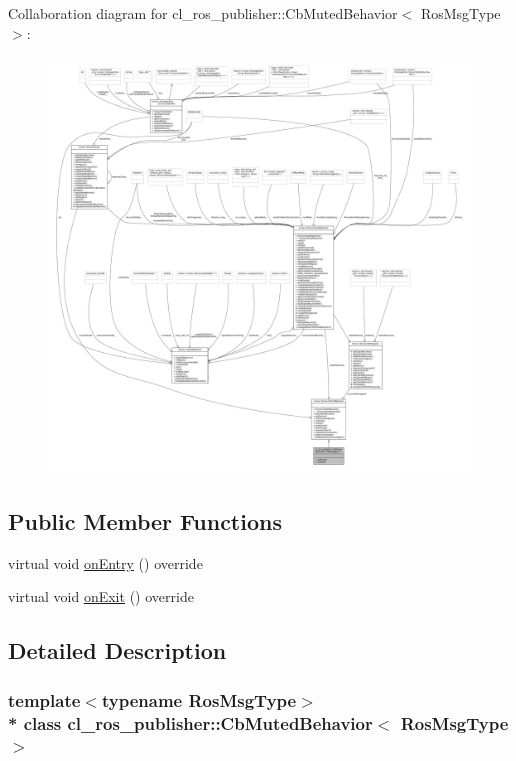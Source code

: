 Collaboration diagram for cl\+\_\+ros\+\_\+publisher\+:\+:Cb\+Muted\+Behavior$<$ Ros\+Msg\+Type $>$\+:
\nopagebreak
\begin{figure}[H]
\begin{center}
\leavevmode
\includegraphics[width=350pt]{classcl__ros__publisher_1_1CbMutedBehavior__coll__graph}
\end{center}
\end{figure}
\subsection*{Public Member Functions}
\begin{DoxyCompactItemize}
\item 
virtual void \hyperlink{classcl__ros__publisher_1_1CbMutedBehavior_a79376d9160e3bd44678a2c0d89f1b4de}{on\+Entry} () override
\item 
virtual void \hyperlink{classcl__ros__publisher_1_1CbMutedBehavior_a4c02187c58358fa811777d9956510222}{on\+Exit} () override
\end{DoxyCompactItemize}


\subsection{Detailed Description}
\subsubsection*{template$<$typename Ros\+Msg\+Type$>$\\*
class cl\+\_\+ros\+\_\+publisher\+::\+Cb\+Muted\+Behavior$<$ Ros\+Msg\+Type $>$}



